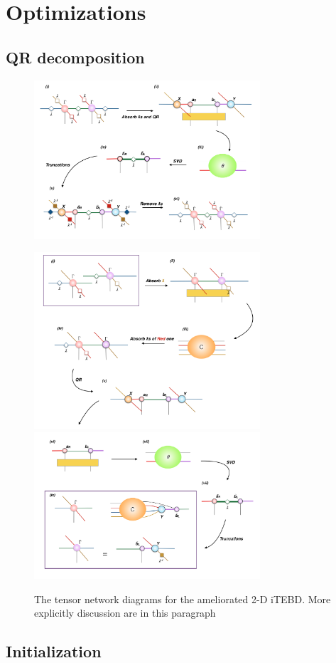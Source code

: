 \section{Optimizations}
\label{2dopt}

\subsection{QR decomposition}
\label{2doptQR}
	\begin{figure}[ht]
	\centering
	\includegraphics[width=0.75\textwidth]{figures/fig317.png}
	\caption[The tensor network diagrams for the 2-D iTEBD with QR decomposition]{}
	\label{fig317}
	\end{figure}

	\begin{figure}[ht]
	\centering
	\includegraphics[width=0.75\textwidth]{figures/fig318.png}
	\includegraphics[width=0.75\textwidth]{figures/fig319.png}
	\caption[The tensor network diagrams for the ameliorated 2-D iTEBD with QR decompositiont]{The tensor network diagrams for the ameliorated 2-D iTEBD. More explicitly discussion are in	this paragraph}
	\label{fig318}
	\end{figure}

\subsection{Initialization}
\label{2doptInit}

